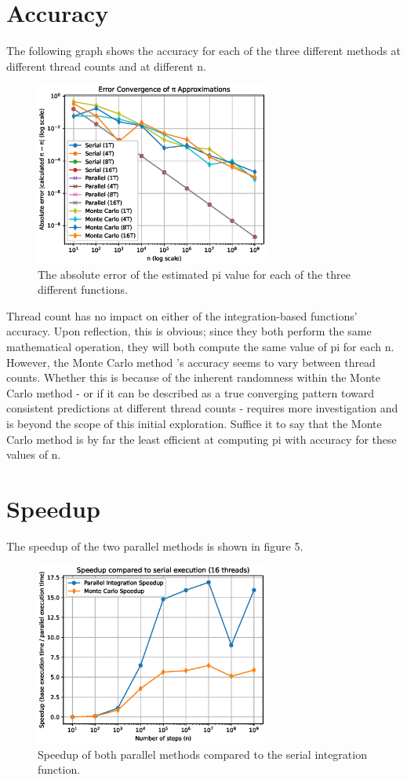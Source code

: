 \documentclass[a4paper]{article}
\begin{document}
\section{Accuracy}
The following graph shows the accuracy for each of the three different methods at different thread counts and at different n.
\begin{figure}[ht]
\begin{center}
\includegraphics[height=6cm]{errs.eps}
\caption{The absolute error of the estimated pi value for each of the three different functions.}
\label{fig4}
\end{center}
\end{figure}
Thread count has no impact on either of the integration-based functions' accuracy. Upon reflection, this is obvious; since they both perform the same mathematical operation, they will both compute the same value of pi for each n. However, the Monte Carlo method 's accuracy seems to vary between thread counts. Whether this is because of the inherent randomness within the Monte Carlo method - or if it can be described as a true converging pattern toward consistent predictions at different thread counts - requires more investigation and is beyond the scope of this initial exploration. Suffice it to say that the Monte Carlo method is by far the least efficient at computing pi with accuracy for these values of n. 

\section{Speedup}
The speedup of the two parallel methods is shown in figure 5.
\begin{figure}[ht]
\begin{center}
\includegraphics[height=6cm]{speedup.eps}
\caption{Speedup of both parallel methods compared to the serial integration function.}
\label{fig5}
\end{center}
\end{figure}
\end{document}

